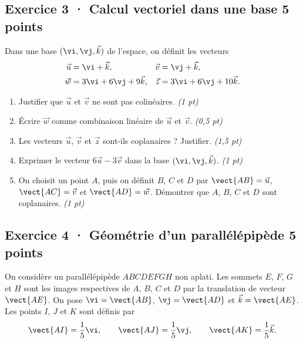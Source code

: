 \clearpage{}\par

\subsection*{Exercice 3 · Calcul vectoriel dans une base \hfill 5 points}Dans une base $(\vi,\vj,\vec k)$ de l'espace, on définit les vecteurs
\[\begin{aligned}\vec u&=\vi+\vec k,&\vec v&=\vj+\vec k,\\
\vec w&=3\vi+6\vj+9\vec k,&\vec z&=3\vi+6\vj+10\vec k.\end{aligned}\]

\begin{enumerate}

\item Justifier que $\vec u$ et $\vec v$ ne sont pas colinéaires. \hfill\textit{(1 pt)}

\item Écrire $\vec w$ comme combinaison linéaire de $\vec u$ et $\vec v$. \hfill\textit{(0,5 pt)}

\item Les vecteurs $\vec u$, $\vec v$ et $\vec z$ sont-ils coplanaires ? Justifier. \hfill\textit{(1,5 pt)}

\item Exprimer le vecteur $6\vec u-3\vec v$ dans la base $(\vi,\vj,\vec k)$. \hfill\textit{(1 pt)}

\item On choisit un point $A$, puis on définit $B$, $C$ et $D$ par $\vect{AB}=\vec u$, $\vect{AC}=\vec v$ et $\vect{AD}=\vec w$. Démontrer que $A$, $B$, $C$ et $D$ sont coplanaires. \hfill\textit{(1 pt)}

\end{enumerate}

\subsection*{Exercice 4 · Géométrie d'un parallélépipède \hfill 5 points}On considère un parallélépipède $ABCDEFGH$ non aplati. Les sommets $E$, $F$, $G$ et $H$ sont les images respectives de $A$, $B$, $C$ et $D$ par la translation de vecteur $\vect{AE}$.
On pose $\vi=\vect{AB}$, $\vj=\vect{AD}$ et $\vec k=\vect{AE}$.
Les points $I$, $J$ et $K$ sont définis par
\[\vect{AI}=\frac1{5}\vi,\qquad\vect{AJ}=\frac1{5}\vj,\qquad\vect{AK}=\frac1{5}\vec k.\]

